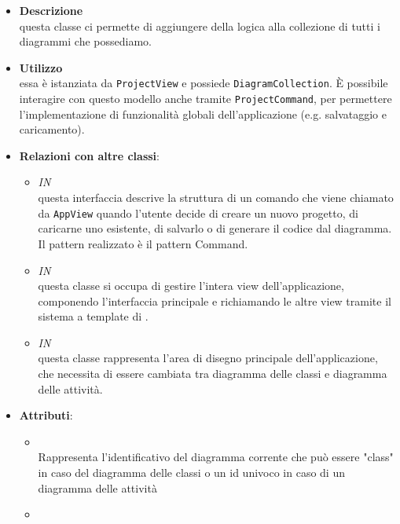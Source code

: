 \label{\nogloxy{swedesigner::client::model::ProjectModel}}
\begin{itemize}
\item \textbf{Descrizione}\\
questa classe ci permette di aggiungere della logica alla collezione di tutti i diagrammi che possediamo.
\item \textbf{Utilizzo}\\
essa è istanziata da \texttt{ProjectView} e possiede \texttt{DiagramCollection}. È possibile interagire con questo modello anche tramite \texttt{ProjectCommand}, per permettere l'implementazione di funzionalità globali dell'applicazione (e.g. salvataggio e caricamento).
\item \textbf{Relazioni con altre classi}:
\begin{itemize}
\item \textit{IN} \hyperref[\nogloxy{swedesigner::client::model::ProjectCommand}]{}\\
questa interfaccia descrive la struttura di un comando che viene chiamato da \texttt{AppView} quando l'utente decide di creare un nuovo progetto, di caricarne uno esistente, di salvarlo o di generare il codice dal diagramma. Il pattern realizzato è il pattern Command.
\item \textit{IN} \hyperref[\nogloxy{swedesigner::client::view::AppView}]{}\\
questa classe si occupa di gestire l'intera view dell'applicazione, componendo l'interfaccia principale e richiamando le altre view tramite il sistema a template di \backbonejs{}.
\item \textit{IN} \hyperref[\nogloxy{swedesigner::client::view::ProjectView}]{}\\
questa classe rappresenta l'area di disegno principale dell'applicazione, che necessita di essere cambiata tra diagramma delle classi e diagramma delle attività. 
\end{itemize}
\item \textbf{Attributi}:
\begin{itemize}
\item {}
\\ Rappresenta l'identificativo del diagramma corrente che può essere "class" in caso del diagramma delle classi o un id univoco in caso di un diagramma delle attività
\item {}

\end{itemize}
\end{itemize}
